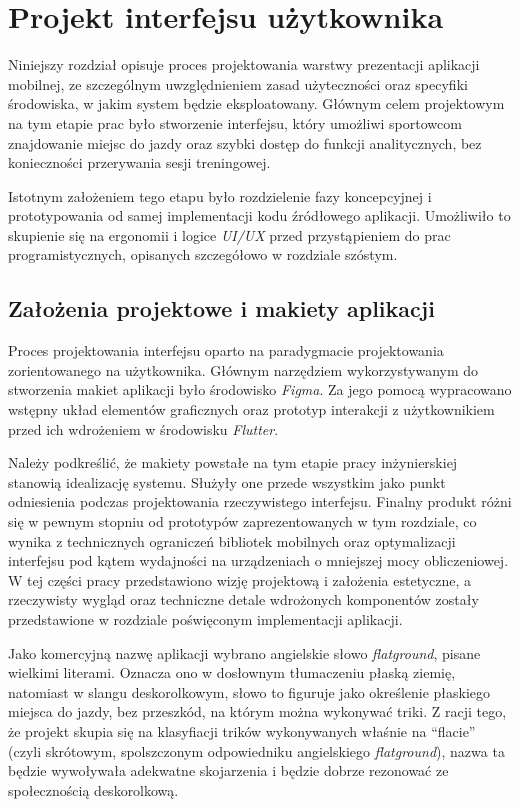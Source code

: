 \newpage
\section{Projekt interfejsu użytkownika}
    Niniejszy rozdział opisuje proces projektowania warstwy prezentacji aplikacji mobilnej, ze szczególnym uwzględnieniem zasad użyteczności oraz specyfiki środowiska, w jakim system będzie eksploatowany. Głównym celem projektowym na tym etapie prac było stworzenie interfejsu, który umożliwi sportowcom znajdowanie miejsc do jazdy oraz szybki dostęp do funkcji analitycznych, bez konieczności przerywania sesji treningowej.

    Istotnym założeniem tego etapu było rozdzielenie fazy koncepcyjnej i prototypowania od samej implementacji kodu źródłowego aplikacji. Umożliwiło to skupienie się na ergonomii i logice \textit{UI/UX} przed przystąpieniem do prac programistycznych, opisanych szczegółowo w rozdziale szóstym.
    
    \subsection{Założenia projektowe i makiety aplikacji}

        Proces projektowania interfejsu oparto na paradygmacie projektowania zorientowanego na użytkownika. Głównym narzędziem wykorzystywanym do stworzenia makiet aplikacji było środowisko \textit{Figma}. Za jego pomocą wypracowano wstępny układ elementów graficznych oraz prototyp interakcji z użytkownikiem przed ich wdrożeniem w środowisku \textit{Flutter}.

        Należy podkreślić, że makiety powstałe na tym etapie pracy inżynierskiej stanowią idealizację systemu. Służyły one przede wszystkim jako punkt odniesienia podczas projektowania rzeczywistego interfejsu. Finalny produkt różni się w pewnym stopniu od prototypów zaprezentowanych w tym rozdziale, co wynika z technicznych ograniczeń bibliotek mobilnych oraz optymalizacji interfejsu pod kątem wydajności na urządzeniach o mniejszej mocy obliczeniowej. W tej części pracy przedstawiono wizję projektową i założenia estetyczne, a rzeczywisty wygląd oraz techniczne detale wdrożonych komponentów zostały przedstawione w rozdziale poświęconym implementacji aplikacji.

        Jako komercyjną nazwę aplikacji wybrano angielskie słowo \textit{flatground}, pisane wielkimi literami. Oznacza ono w dosłownym tłumaczeniu płaską ziemię, natomiast w slangu deskorolkowym, słowo to figuruje jako określenie płaskiego miejsca do jazdy, bez przeszkód, na którym można wykonywać triki. Z racji tego, że projekt skupia się na klasyfiacji trików wykonywanych właśnie na \enquote{flacie} (czyli skrótowym, spolszczonym odpowiedniku angielskiego \textit{flatground}), nazwa ta będzie wywoływała adekwatne skojarzenia i będzie dobrze rezonować ze społecznością deskorolkową.

